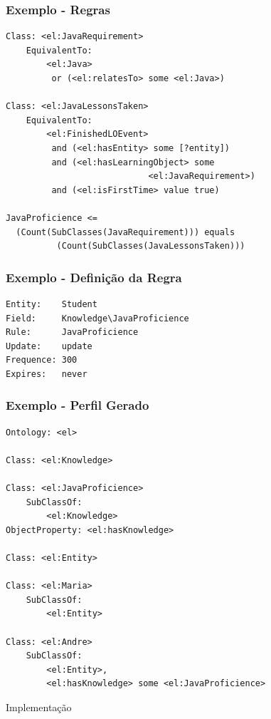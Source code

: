 \documentclass[14pt]{beamer}
\begin{document}

\begin{frame}[fragile]
  \frametitle{Exemplo - Regras}
 
\begin{lstlisting}
Class: <el:JavaRequirement>
    EquivalentTo: 
        <el:Java>
         or (<el:relatesTo> some <el:Java>)

Class: <el:JavaLessonsTaken>
    EquivalentTo: 
        <el:FinishedLOEvent>
         and (<el:hasEntity> some [?entity])
         and (<el:hasLearningObject> some 
	                        <el:JavaRequirement>)
         and (<el:isFirstTime> value true)

JavaProficience <= 
  (Count(SubClasses(JavaRequirement))) equals
          (Count(SubClasses(JavaLessonsTaken)))
\end{lstlisting}

\end{frame}


\begin{frame}[fragile]
  \frametitle{Exemplo - Definição da Regra}
\begin{lstlisting}
Entity:    Student
Field:     Knowledge\JavaProficience
Rule:      JavaProficience
Update:    update
Frequence: 300
Expires:   never
\end{lstlisting}
  
\end{frame}


\begin{frame}[fragile]
  \frametitle{Exemplo - Perfil Gerado}
\begin{lstlisting}
Ontology: <el>

Class: <el:Knowledge>

Class: <el:JavaProficience>
    SubClassOf: 
        <el:Knowledge>
ObjectProperty: <el:hasKnowledge>
    
Class: <el:Entity>
    
Class: <el:Maria>
    SubClassOf: 
        <el:Entity>
    
Class: <el:Andre>
    SubClassOf: 
        <el:Entity>,
        <el:hasKnowledge> some <el:JavaProficience>
\end{lstlisting}
  
\end{frame}


\begin{frame}
  \huge Implementação
\end{frame}
\end{document}
